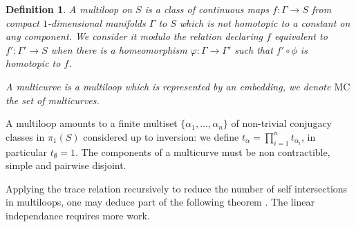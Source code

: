 \documentclass{amsart}
\newtheorem{definition}{Definition}
\newcommand{\C}{\mathbb{C}}
\newcommand{\MC}{\mathrm{MC}}
\begin{document}
\begin{definition}
A \emph{multiloop} on $S$ is a class of continuous maps $f\colon \Gamma \to S$ from compact $1$-dimensional manifolds $\Gamma$ to $S$ which is not homotopic to a constant on any component. We consider it modulo the relation declaring $f$ equivalent to $f'\colon \Gamma'\to S$ when there is a homeomorphism $\varphi:\Gamma\to \Gamma'$ such that $f'\circ \phi$ is homotopic to $f$. 

A \emph{multicurve} is a multiloop which is represented by an embedding, we denote $\MC$ the set of multicurves.
\end{definition}

%
A multiloop amounts to a finite multiset $\{\alpha_1,\ldots,\alpha_n\}$ of non-trivial conjugacy classes in $\pi_1(S)$ considered up to inversion: we define $t_\alpha=\prod_{i=1}^n t_{\alpha_i}$, in particular $t_\emptyset = 1$.
%
%
The components of a multicurve must be non contractible, simple and pairwise disjoint. %

%

Applying the trace relation recursively to reduce the number of self intersections in multiloops, one may deduce part of the following theorem \cite{PrSi_sl2-skein_2000}. The linear independance requires more work.

\end{document}
